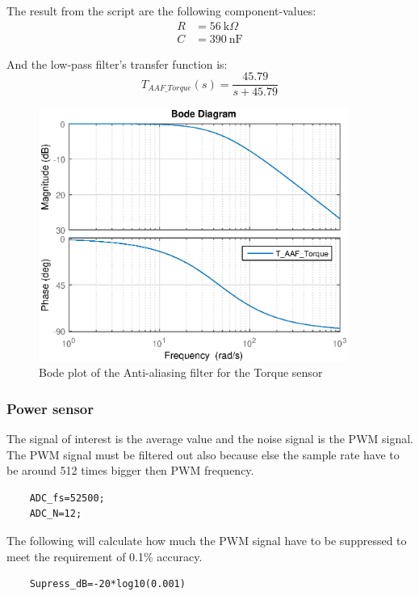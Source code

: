 The result from the script are the following component-values:	
\begin{equation}
	\begin{split}
	R &= \SI{56}{\kilo\Omega}\\
	C &= \SI{390}{\nano\F}
	\end{split}
\end{equation}
	
And the low-pass filter's transfer function is:
\begin{equation}
	T_{{AAF\_Torque}}(s) = \frac{45.79}{s+ 45.79}
\end{equation}
	
	
\begin{figure}[H]
	\centering
	\includegraphics [width=4in]{Hardware/Pictures/FilterAnalyse_01.eps}
	\caption{Bode plot of the Anti-aliasing filter for the Torque sensor}
	\label{fig:BODE_AAF_Torque}
\end{figure}
	
	
\subsubsection*{Power sensor}
The signal of interest is the average value and the noise signal is the PWM signal.  The PWM signal must be filtered out also because else the sample rate have to be around 512 times bigger then PWM frequency.
	
\begin{lstlisting}
	ADC_fs=52500;
	ADC_N=12;
\end{lstlisting}
	
The following will calculate how much the PWM signal have to be suppressed to meet the requirement of 0.1\% accuracy.
	
\begin{lstlisting}
	Supress_dB=-20*log10(0.001)
\end{lstlisting}


